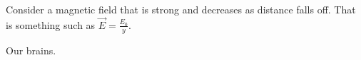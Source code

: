 \documentclass[11pt]{article}
\begin{document}
Consider a magnetic field that is strong and decreases as distance falls off. That is something such as $\vec{E} = \frac{E_0}{y}$.


\begin{thebibliography}{9}
	 Our brains.
\end{thebibliography}

\end{document}
